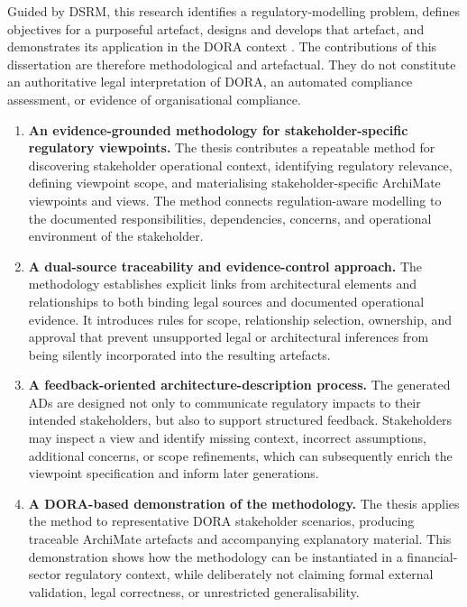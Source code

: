 Guided by \ac{DSRM}, this research identifies a regulatory-modelling problem, defines objectives for a purposeful artefact, designs and develops that artefact, and demonstrates its application in the \ac{DORA} context \cite{PeffersEtAl2007}. The contributions of this dissertation are therefore methodological and artefactual. They do not constitute an authoritative legal interpretation of \ac{DORA}, an automated compliance assessment, or evidence of organisational compliance.

\begin{enumerate}
    \item \textbf{An evidence-grounded methodology for stakeholder-specific regulatory viewpoints.}
    The thesis contributes a repeatable method for discovering stakeholder operational context, identifying regulatory relevance, defining viewpoint scope, and materialising stakeholder-specific ArchiMate viewpoints and views. The method connects regulation-aware modelling to the documented responsibilities, dependencies, concerns, and operational environment of the stakeholder.

    \item \textbf{A dual-source traceability and evidence-control approach.}
    The methodology establishes explicit links from architectural elements and relationships to both binding legal sources and documented operational evidence. It introduces rules for scope, relationship selection, ownership, and approval that prevent unsupported legal or architectural inferences from being silently incorporated into the resulting artefacts.

    \item \textbf{A feedback-oriented architecture-description process.}
    The generated \acp{AD} are designed not only to communicate regulatory impacts to their intended stakeholders, but also to support structured feedback. Stakeholders may inspect a view and identify missing context, incorrect assumptions, additional concerns, or scope refinements, which can subsequently enrich the viewpoint specification and inform later generations.

    \item \textbf{A \ac{DORA}-based demonstration of the methodology.}
    The thesis applies the method to representative \ac{DORA} stakeholder scenarios, producing traceable ArchiMate artefacts and accompanying explanatory material. This demonstration shows how the methodology can be instantiated in a financial-sector regulatory context, while deliberately not claiming formal external validation, legal correctness, or unrestricted generalisability.
\end{enumerate}

